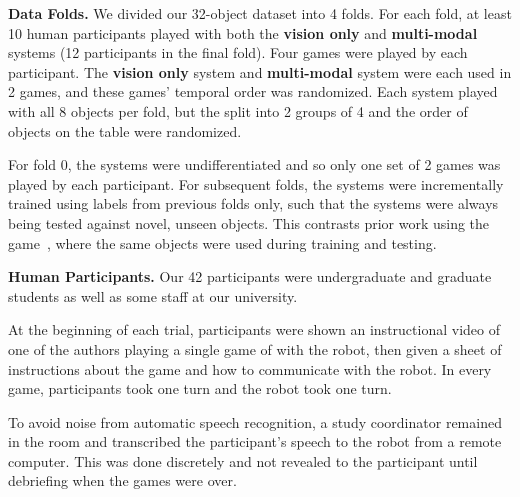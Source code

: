 \textbf{Data Folds.}
We divided our 32-object dataset into 4 folds.
For each fold, at least 10 human participants played \ispy with both the \textbf{vision only} and \textbf{multi-modal} systems (12 participants in the final fold).
Four games were played by each participant.
The \textbf{vision only} system and \textbf{multi-modal} system were each used in 2 games, and these games' temporal order was randomized.
Each system played with all 8 objects per fold, but the split into 2 groups of 4 and the order of objects on the table were randomized.

For fold 0, the systems were undifferentiated and so only one set of 2 games was played by each participant. 
For subsequent folds, the systems were incrementally trained using labels from previous folds only, such that the systems were always being tested against novel, unseen objects.
This contrasts prior work using the \ispy game~\cite{parde:ijcai15}, where the same objects were used during training and testing.

\textbf{Human Participants.} Our 42 participants were undergraduate and graduate students as well as some staff at our university.

At the beginning of each trial, participants were shown an instructional video of one of the authors playing a single game of \ispy with the robot, then given a sheet of instructions about the game and how to communicate with the robot. 
In every game, participants took one turn and the robot took one turn.

To avoid noise from automatic speech recognition, a study coordinator remained in the room and transcribed the participant's speech to the robot from a remote computer.
This was done discretely and not revealed to the participant until debriefing when the games were over.
